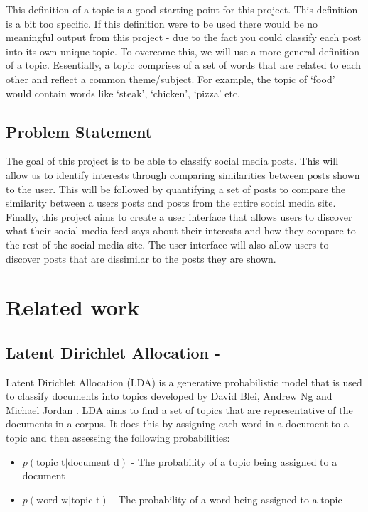 This definition of a topic is a good starting point for this project. This definition is a bit too specific. If this definition were 
to be used there would be no meaningful output from this project - due to the fact you could classify each post into its own unique
topic. To overcome this, we will use a more general definition of a topic. Essentially, a topic comprises of a set of words that
are related to each other and reflect a common theme/subject. For example, the topic of `food' would contain words like `steak',
`chicken', `pizza' etc.

\subsection{Problem Statement}
The goal of this project is to be able to classify social media posts. This will allow us to identify interests through comparing
similarities between posts shown to the user. This will be followed by quantifying a set of posts to compare the similarity between
a users posts and posts from the entire social media site. Finally, this project aims to create a user interface that allows users
to discover what their social media feed says about their interests and how they compare to the rest of the social media site. The
user interface will also allow users to discover posts that are dissimilar to the posts they are shown.


\section{Related work}
\subsection{Latent Dirichlet Allocation - \cite{lda}}
Latent Dirichlet Allocation (LDA) is a generative probabilistic model that is used to classify documents into topics developed
by David Blei, Andrew Ng and Michael Jordan \cite{lda}. LDA aims to find a set of topics that are representative of the documents
in a corpus. It does this by assigning each word in a document to a topic and then assessing the following probabilities:
\begin{itemize}
    \item $p(\text{topic t} \vert \text{document d})$ - The probability of a topic being assigned to a document
    \item $p(\text{word w} \vert \text{topic t})$ - The probability of a word being assigned to a topic
\end{itemize}

